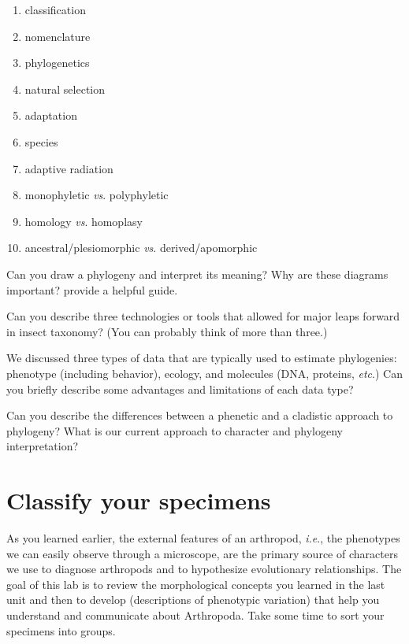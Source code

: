 \begin{enumerate} 
\item classification
\item nomenclature
\item phylogenetics 
\item{natural selection} 
\item{adaptation}  
\item{species}  
\item {adaptive radiation}
\item {monophyletic \textit{vs}. polyphyletic}  
\item {homology \textit{vs}. homoplasy}  
\item {ancestral/plesiomorphic \textit{vs}. derived/apomorphic}
\end{enumerate}

\noindent{}Can you draw a phylogeny and interpret its meaning? Why are these diagrams important? \cite{baum2008phylogenics} provide a helpful guide.\vspace{3mm}

\noindent{}Can you describe three technologies or tools that allowed for major leaps forward in insect taxonomy? (You can probably think of more than three.)\vspace{3mm}

\noindent{}We discussed three types of data that are typically used to estimate phylogenies: phenotype (including behavior), ecology, and molecules (DNA, proteins, \textit{etc}.) Can you briefly describe some advantages and limitations of each data type?\vspace{3mm}

\noindent{}Can you describe the differences between a phenetic and a cladistic approach to phylogeny? What is our current approach to character and phylogeny interpretation?\vspace{3mm}

\section{Classify your specimens}
As you learned earlier, the external features of an arthropod, \textit{i.e}., the phenotypes we can easily observe through a microscope, are the primary source of characters we use to diagnose arthropods and to hypothesize evolutionary relationships. The goal of this lab is to review the morphological concepts you learned in the last unit and then to develop  (descriptions of phenotypic variation) that help you understand and communicate about Arthropoda. Take some time to sort your specimens into groups.\vspace{3mm}

